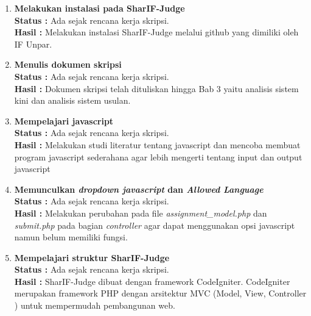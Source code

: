 \documentclass[a4paper,twoside]{article}
\begin{document}
	\begin{enumerate}
		\item \textbf{Melakukan instalasi pada SharIF-Judge}\\
		{\bf Status :} Ada sejak rencana kerja skripsi.\\
		{\bf Hasil :} Melakukan instalasi SharIF-Judge melalui github yang dimiliki oleh IF Unpar.
		
		\item \textbf{Menulis dokumen skripsi}\\
		{\bf Status :} Ada sejak rencana kerja skripsi.\\
		{\bf Hasil :} Dokumen skripsi telah dituliskan hingga Bab 3 yaitu analisis sistem kini dan analisis sistem usulan.

		\item \textbf{Mempelajari javascript}\\
		{\bf Status :} Ada sejak rencana kerja skripsi.\\
		{\bf Hasil :} Melakukan studi literatur tentang javascript dan mencoba membuat program javascript sederahana agar lebih mengerti tentang input dan output javascript

		\item \textbf{Memunculkan \textit{dropdown javascript} dan \textit{Allowed Language}}\\
		{\bf Status :} Ada sejak rencana kerja skripsi.\\
		{\bf Hasil :} Melakukan perubahan pada file \textit{assignment\_model.php} dan \textit{submit.php} pada bagian \textit{controller} agar dapat menggunakan opsi javascript namun belum memiliki fungsi.

		\item \textbf{Mempelajari struktur SharIF-Judge}\\
		{\bf Status :} Ada sejak rencana kerja skripsi.\\
		{\bf Hasil :} SharIF-Judge dibuat dengan framework CodeIgniter. CodeIgniter merupakan framework PHP dengan arsitektur MVC (Model, View, Controller ) untuk mempermudah pembangunan web.


\end{enumerate}
\end{document}
